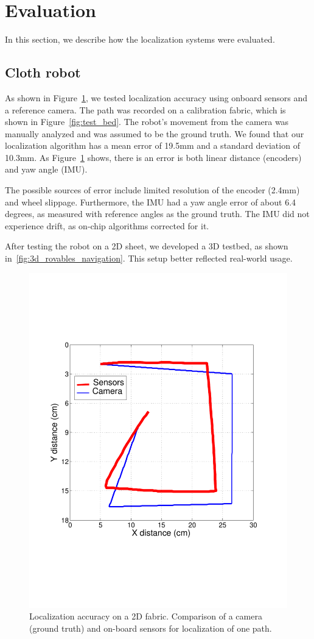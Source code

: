 \section{Evaluation}
In this section, we describe how the localization systems were evaluated.
\subsection{Cloth robot}
As shown in Figure~\ref{fig:localization_accuracy_rovables}, we tested localization accuracy using onboard sensors and a reference camera. The path was recorded on a calibration fabric, which is shown in Figure~\ref{fig:test_bed}. The robot's movement from the camera was manually analyzed and was assumed to be the ground truth. We found that our localization algorithm has a mean error of 19.5mm and a standard deviation of 10.3mm. As Figure~\ref{fig:localization_accuracy_rovables} shows, there is an error is both linear distance (encoders) and yaw angle (IMU).

The possible sources of error include limited resolution of the encoder (2.4mm) and wheel slippage. Furthermore, the IMU had a yaw angle error of about 6.4 degrees, as measured with reference angles as the ground truth. The IMU did not experience drift, as on-chip algorithms corrected for it. 

After testing the robot on a 2D sheet, we developed a 3D testbed, as shown in~\ref{fig:3d_rovables_navigation}. This setup better reflected real-world usage. 

\begin{figure}[h]
\centering
  \includegraphics[width=0.7\columnwidth]{pictures/chapter5/robot_localization_v1_plot.pdf}
  \caption{Localization accuracy on a 2D fabric. Comparison of a camera (ground truth) and on-board sensors for localization of one path. }
  \label{fig:localization_accuracy_rovables}
\end{figure}

